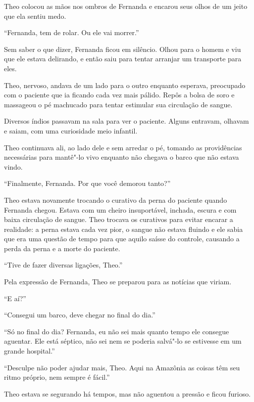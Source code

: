 Theo colocou as mãos nos ombros de Fernanda e encarou seus olhos de um
jeito que ela sentiu medo.

``Fernanda, tem de rolar. Ou ele vai morrer.''

Sem saber o que dizer, Fernanda ficou em silêncio. Olhou para o homem e
viu que ele estava delirando, e então saiu para tentar arranjar um
transporte para eles.

Theo, nervoso, andava de um lado para o outro enquanto esperava,
preocupado com o paciente que ia ficando cada vez mais pálido. Repôs a
bolsa de soro e massageou o pé machucado para tentar estimular sua
circulação de sangue.

Diversos índios passavam na sala
para ver o paciente. Alguns entravam, olhavam e saiam, com uma
curiosidade meio infantil.

Theo continuava ali, ao lado dele e sem
arredar o pé, tomando as providências necessárias para mantê"-lo vivo
enquanto não chegava o barco que não estava vindo.

\asterisc


``Finalmente, Fernanda. Por que você demorou tanto?''

Theo estava novamente trocando o curativo da perna do paciente quando
Fernanda chegou. Estava com um cheiro insuportável, inchada,
escura e com baixa circulação de sangue. Theo trocava os curativos para
evitar encarar a realidade: a perna estava cada vez pior, o sangue
não estava fluindo e ele sabia que era uma questão de tempo para que
aquilo saísse do controle, causando a perda da perna e a morte do
paciente.

``Tive de fazer diversas ligações, Theo.''

Pela expressão de Fernanda, Theo se preparou para as notícias que
viriam.

``E aí?''

``Consegui um barco, deve chegar no final do dia.''

``Só no final do dia? Fernanda, eu não sei mais quanto tempo ele
consegue aguentar. Ele está séptico, não sei nem se poderia salvá"-lo se
estivesse em um grande hospital.''

``Desculpe não poder ajudar mais, Theo. Aqui na Amazônia as coisas têm
seu ritmo próprio, nem sempre é fácil.''

Theo estava se segurando há tempos, mas não aguentou a pressão e ficou
furioso.

